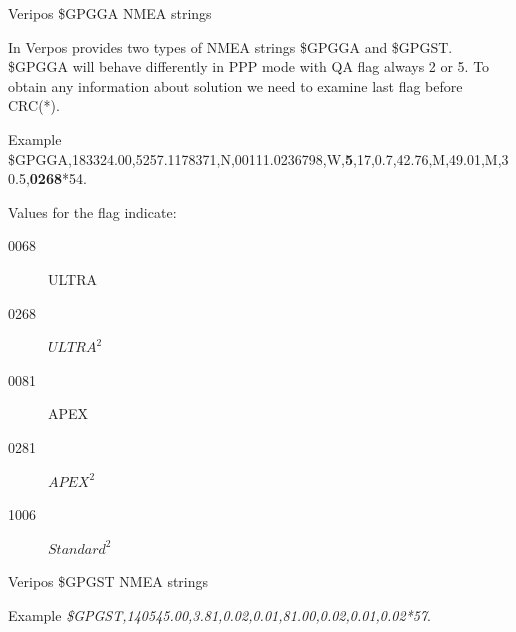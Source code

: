 \documentclass[11pt]{beamer}
\begin{document}
\begin{frame}{Veripos \$GPGGA NMEA strings}
	
	In Verpos provides two types of NMEA strings \$GPGGA and \$GPGST. \$GPGGA will behave differently in PPP mode with QA flag always 2 or 5. To obtain any information about solution we need to examine last flag before CRC(*).\\
	
	
	\begin{exampleblock}{Example}
		{\tiny{\$GPGGA,183324.00,5257.1178371,N,00111.0236798,W,\textbf{5},17,0.7,42.76,M,49.01,M,30.5,{\color{red}\textbf{0268}}*54}.}
	\end{exampleblock}
	
	Values for the flag indicate:	
	\begin{description}
		\item [0068]	ULTRA
		\item [0268]	$ULTRA^2$
		\item [0081]	APEX
		\item [0281]	$APEX^2$
		\item [1006]	$Standard^2$
	\end{description}
\end{frame}

\begin{frame}[plain]{Veripos \$GPGST NMEA strings}

	\begin{exampleblock}{Example}
		{\textit{\$GPGST,140545.00,3.81,0.02,0.01,81.00,0.02,0.01,0.02*57}.}
	\end{exampleblock}
	\vspace*{-1cm}
	\begin{table}
		\centering
		\begin{minipage}[t]{\textheight}%
		\end{minipage}
	\end{table}
\end{frame}



\end{document}

